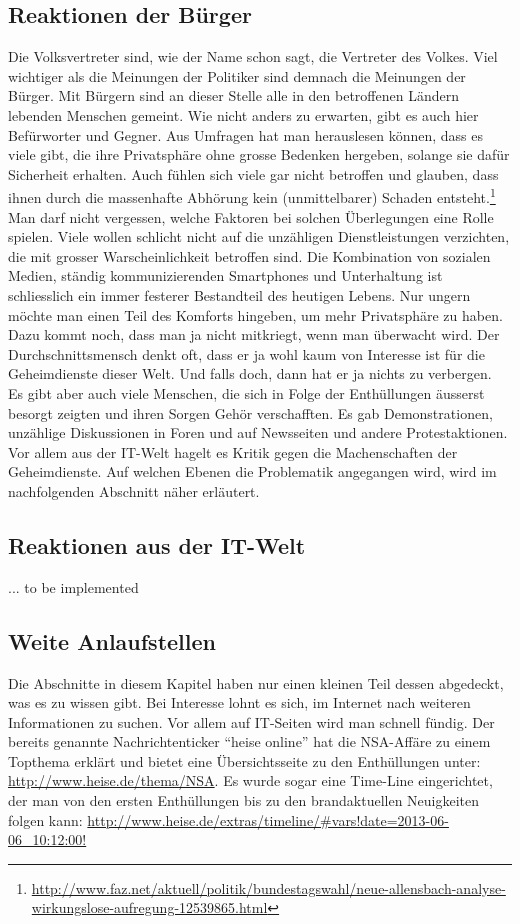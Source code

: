 \subsection{Reaktionen der Bürger}
Die Volksvertreter sind, wie der Name schon sagt, die Vertreter des Volkes. Viel wichtiger als die Meinungen der Politiker sind demnach die Meinungen der Bürger. Mit Bürgern sind an dieser Stelle alle in den betroffenen Ländern lebenden Menschen gemeint. Wie nicht anders zu erwarten, gibt es auch hier Befürworter und Gegner. Aus Umfragen hat man herauslesen können, dass es viele gibt, die ihre Privatsphäre ohne grosse Bedenken hergeben, solange sie dafür Sicherheit erhalten. Auch fühlen sich viele gar nicht betroffen und glauben, dass ihnen durch die massenhafte Abhörung kein (unmittelbarer) Schaden entsteht.\footnote{\url{http://www.faz.net/aktuell/politik/bundestagswahl/neue-allensbach-analyse-wirkungslose-aufregung-12539865.html}}
\\
Man darf nicht vergessen, welche Faktoren bei solchen Überlegungen eine Rolle spielen. Viele wollen schlicht nicht auf die unzähligen Dienstleistungen verzichten, die mit grosser Warscheinlichkeit betroffen sind. Die Kombination von sozialen Medien, ständig kommunizierenden Smartphones und Unterhaltung ist schliesslich ein immer festerer Bestandteil des heutigen Lebens. Nur ungern möchte man einen Teil des Komforts hingeben, um mehr Privatsphäre zu haben. Dazu kommt noch, dass man ja nicht mitkriegt, wenn man überwacht wird. Der Durchschnittsmensch denkt oft, dass er ja wohl kaum von Interesse ist für die Geheimdienste dieser Welt. Und falls doch, dann hat er ja nichts zu verbergen.
\\
Es gibt aber auch viele Menschen, die sich in Folge der Enthüllungen äusserst besorgt zeigten und ihren Sorgen Gehör verschafften. Es gab Demonstrationen, unzählige Diskussionen in Foren und auf Newsseiten und andere Protestaktionen. Vor allem aus der IT-Welt hagelt es Kritik gegen die Machenschaften der Geheimdienste. Auf welchen Ebenen die Problematik angegangen wird, wird im nachfolgenden Abschnitt näher erläutert.

\subsection{Reaktionen aus der IT-Welt}
... to be implemented

\subsection{Weite Anlaufstellen}
Die Abschnitte in diesem Kapitel haben nur einen kleinen Teil dessen abgedeckt, was es zu wissen gibt. Bei Interesse lohnt es sich, im Internet nach weiteren Informationen zu suchen. Vor allem auf IT-Seiten wird man schnell fündig. Der bereits genannte Nachrichtenticker ``heise online'' hat die NSA-Affäre zu einem Topthema erklärt und bietet eine Übersichtsseite zu den Enthüllungen unter: \url{http://www.heise.de/thema/NSA}. Es wurde sogar eine Time-Line eingerichtet, der man von den ersten Enthüllungen bis zu den brandaktuellen Neuigkeiten folgen kann: \url{http://www.heise.de/extras/timeline/#vars!date=2013-06-06_10:12:00!}